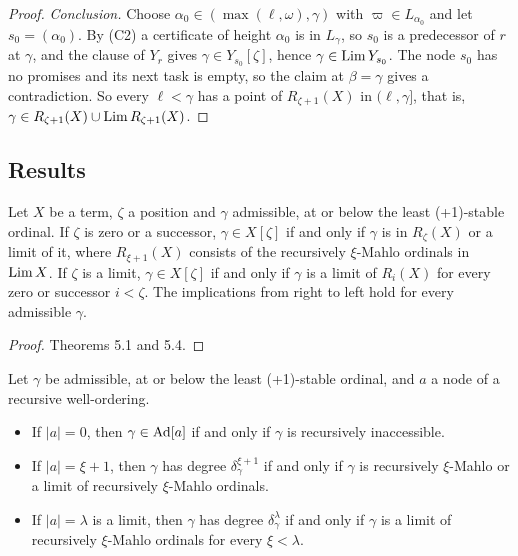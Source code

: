\documentclass[11pt]{article}
\begin{document}
\begin{proof}
\emph{Conclusion.} Choose $\alpha_0 \in (\max(\ell,\omega), \gamma)$ with $\varpi \in L_{\alpha_0}$ and let $s_0 =
(\alpha_0)$. By (C2) a certificate of height $\alpha_0$ is in $L_\gamma$, so $s_0$ is a predecessor of $r$ at $\gamma$,
and the clause of $Y_r$ gives $\gamma \in Y_{s_0}[\zeta]$, hence $\gamma \in \mathrm{Lim}\, Y_{s_0}$. The node $s_0$ has no
promises and its next task is empty, so the claim at $\beta = \gamma$ gives a contradiction. So every $\ell < \gamma$
has a point of $R_{\zeta+1}(X)$ in $(\ell, \gamma]$, that is, $\gamma \in R_{\zeta+1}(X) \cup \mathrm{Lim}\, R_{\zeta+1}(X)$.
\end{proof}

\subsection{Results}

\begin{statement} Let $X$ be a term, $\zeta$ a position and $\gamma$ admissible, at or below the
least (+1)-stable ordinal. If $\zeta$
is zero or a successor, $\gamma \in X[\zeta]$ if and only if $\gamma$ is in $R_\zeta(X)$ or a limit of it, where
$R_{\xi+1}(X)$ consists of the recursively $\xi$-Mahlo ordinals in $\mathrm{Lim}\, X$. If $\zeta$ is a limit, $\gamma \in
X[\zeta]$ if and only if $\gamma$ is a limit of $R_i(X)$ for every zero or successor $i < \zeta$. The implications from
right to left hold for every admissible $\gamma$.
\end{statement}

\begin{proof}
Theorems 5.1 and 5.4.
\end{proof}

\begin{statement} Let $\gamma$ be admissible, at or below the least
(+1)-stable ordinal, and $a$ a node of a
recursive well-ordering.
\begin{itemize}
\item[(a)] If $|a| = 0$, then $\gamma \in \mathrm{Ad}[a]$ if and only if $\gamma$ is recursively inaccessible.
\item[(b)] If $|a| = \xi+1$, then $\gamma$ has degree $\delta_\gamma^{\xi+1}$ if and only if $\gamma$ is recursively
  $\xi$-Mahlo or a limit of recursively $\xi$-Mahlo ordinals.
\item[(c)] If $|a| = \lambda$ is a limit, then $\gamma$ has degree $\delta_\gamma^\lambda$ if and only if $\gamma$ is a
  limit of recursively $\xi$-Mahlo ordinals for every $\xi < \lambda$.
\end{itemize}
\end{statement}
\end{document}
